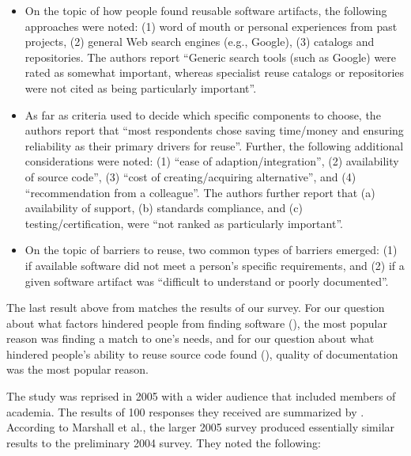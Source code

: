 \documentclass{casicswhitepaper}
\begin{document}
\begin{itemize}

\item On the topic of how people found reusable software artifacts, the following approaches were noted: (1) word of mouth or personal experiences from past projects, (2) general Web search engines (e.g., Google), (3) catalogs and repositories.  The authors report ``Generic search tools (such as Google) were rated as somewhat important, whereas specialist reuse catalogs or repositories were not cited as being particularly important''.

\item As far as criteria used to decide which specific components to choose, the authors report that ``most respondents chose saving time/money and ensuring reliability as their primary drivers for reuse''.  Further, the following additional considerations were noted: (1) ``ease of adaption/integration'', (2) availability of source code'', (3) ``cost of creating/acquiring alternative'', and (4) ``recommendation from a colleague''.  The authors further report that (a) availability of support, (b) standards compliance, and (c) testing/certification, were ``not ranked as particularly important''.

\item On the topic of barriers to reuse, two common types of barriers emerged: (1) if available software did not meet a person's specific requirements, and (2) if a given software artifact was ``difficult to understand or poorly documented''.

\end{itemize}

The last result above from \citet{samadi_2004} matches the results of our survey.  For our question about what factors hindered people from finding software (), the most popular reason was finding a match to one's needs, and for our question about what hindered people's ability to reuse source code found (), quality of documentation was the most popular reason.

The study was reprised in 2005 with a wider audience that included members of academia.  The results of 100 responses they received are summarized by \citet{marshall2006software}.  According to Marshall et al., the larger 2005 survey produced essentially similar results to the preliminary 2004 survey.  They noted the following:
\end{document}
